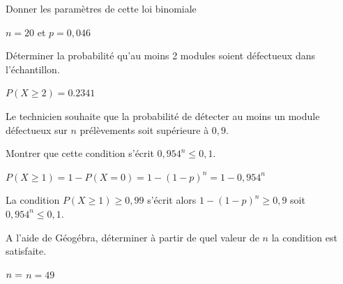\begin{enumerate}[series=monDS, resume]

\begin{minipage}{0.47\textwidth}
        \item Donner les paramètres de cette loi binomiale
\end{minipage}\hfill{}
\begin{minipage}{0.47\textwidth}
    \begin{blocvisiblex}[height=1]
    {\quad}
    $n=20$ et $p=0,046$
    \end{blocvisiblex}
\end{minipage}


\begin{minipage}{0.47\textwidth}
    \bigskip
    \item Déterminer la probabilité qu'au moins 2 modules soient défectueux dans l'échantillon.
\end{minipage}\hfill{}
\begin{minipage}{0.47\textwidth}
    \begin{blocvisiblex}[height=1]
    {\quad}
    $P(X\geq 2)= 0.2341$
    \end{blocvisiblex}
\end{minipage}
\end{enumerate}


Le technicien souhaite que la probabilité de détecter au moins un module défectueux sur $n$ prélèvements soit supérieure à $0,9$.

\begin{enumerate}[series=monDS, resume]
    \item Montrer que cette condition s'écrit ${0,954}^n \leq 0,1$.
    \begin{blocvisiblex}[height=3]
    {\quad}
    $P(X\geq 1)=1-P(X=0)=1-{(1-p)}^n=1-{0,954}^n$

    La condition $P(X\geq 1)\geq0,99$ s'écrit alors $1-{(1-p)}^n\geq 0,9$ soit ${0,954}^n \leq 0,1$.
    \end{blocvisiblex}
    \medskip
    \begin{minipage}{0.50\textwidth}
    \item A l'aide de Géogébra, déterminer à partir de quel valeur de $n$ la condition est satisfaite.
\end{minipage}\hfill{}
\begin{minipage}{0.43\textwidth}
    \begin{blocvisiblex}[height=1]
    {$n=\dotfill$}
    $n= 49$
    \end{blocvisiblex}
\end{minipage}

    \appelprof{}
\end{enumerate}

